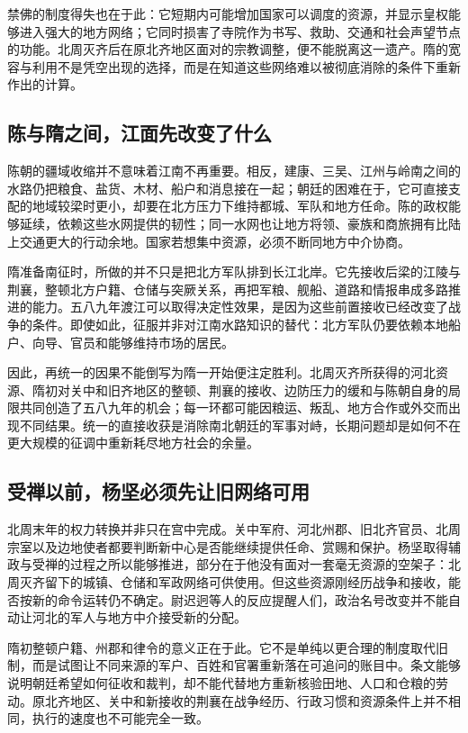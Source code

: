 禁佛的制度得失也在于此：它短期内可能增加国家可以调度的资源，并显示皇权能够进入强大的地方网络；它同时损害了寺院作为书写、救助、交通和社会声望节点的功能。北周灭齐后在原北齐地区面对的宗教调整，便不能脱离这一遗产。隋的宽容与利用不是凭空出现的选择，而是在知道这些网络难以被彻底消除的条件下重新作出的计算。

\subsection{陈与隋之间，江面先改变了什么}

陈朝的疆域收缩并不意味着江南不再重要。相反，建康、三吴、江州与岭南之间的水路仍把粮食、盐货、木材、船户和消息接在一起；朝廷的困难在于，它可直接支配的地域较梁时更小，却要在北方压力下维持都城、军队和地方任命。陈的政权能够延续，依赖这些水网提供的韧性；同一水网也让地方将领、豪族和商旅拥有比陆上交通更大的行动余地。国家若想集中资源，必须不断同地方中介协商。

隋准备南征时，所做的并不只是把北方军队排到长江北岸。它先接收后梁的江陵与荆襄，整顿北方户籍、仓储与突厥关系，再把军粮、舰船、道路和情报串成多路推进的能力。五八九年渡江可以取得决定性效果，是因为这些前置接收已经改变了战争的条件。即使如此，征服并非对江南水路知识的替代：北方军队仍要依赖本地船户、向导、官员和能够维持市场的居民。

因此，再统一的因果不能倒写为隋一开始便注定胜利。北周灭齐所获得的河北资源、隋初对关中和旧齐地区的整顿、荆襄的接收、边防压力的缓和与陈朝自身的局限共同创造了五八九年的机会；每一环都可能因粮运、叛乱、地方合作或外交而出现不同结果。统一的直接收获是消除南北朝廷的军事对峙，长期问题却是如何不在更大规模的征调中重新耗尽地方社会的余量。

\subsection{受禅以前，杨坚必须先让旧网络可用}

北周末年的权力转换并非只在宫中完成。关中军府、河北州郡、旧北齐官员、北周宗室以及边地使者都要判断新中心是否能继续提供任命、赏赐和保护。杨坚取得辅政与受禅的过程之所以能够推进，部分在于他没有面对一套毫无资源的空架子：北周灭齐留下的城镇、仓储和军政网络可供使用。但这些资源刚经历战争和接收，能否按新的命令运转仍不确定。尉迟迥等人的反应提醒人们，政治名号改变并不能自动让河北的军人与地方中介接受新的分配。

隋初整顿户籍、州郡和律令的意义正在于此。它不是单纯以更合理的制度取代旧制，而是试图让不同来源的军户、百姓和官署重新落在可追问的账目中。条文能够说明朝廷希望如何征收和裁判，却不能代替地方重新核验田地、人口和仓粮的劳动。原北齐地区、关中和新接收的荆襄在战争经历、行政习惯和资源条件上并不相同，执行的速度也不可能完全一致。

